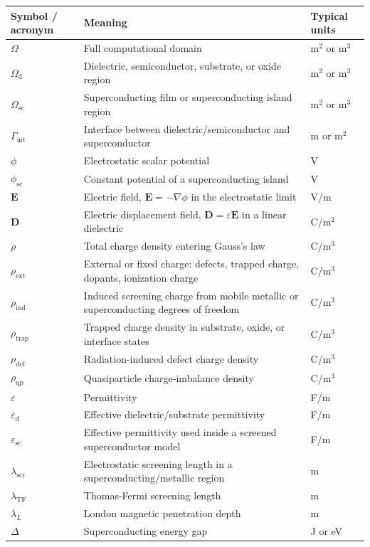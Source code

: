 \documentclass[11pt]{article}
\newcommand{\Evec}{\mathbf{E}}
\newcommand{\Dvec}{\mathbf{D}}
\newcommand{\Om}{\Omega}
\newcommand{\Omd}{\Omega_{\mathrm{d}}}
\newcommand{\Oms}{\Omega_{\mathrm{sc}}}
\newcommand{\Gint}{\Gamma_{\mathrm{int}}}
\newcommand{\epsd}{\varepsilon_{\mathrm{d}}}
\newcommand{\epssc}{\varepsilon_{\mathrm{sc}}}
\newcommand{\rhoext}{\rho_{\mathrm{ext}}}
\newcommand{\rhoind}{\rho_{\mathrm{ind}}}
\newcommand{\rhotrap}{\rho_{\mathrm{trap}}}
\newcommand{\rhodef}{\rho_{\mathrm{def}}}
\newcommand{\rhoqp}{\rho_{\mathrm{qp}}}
\newcommand{\phis}{\phi_{\mathrm{sc}}}
\newcommand{\lams}{\lambda_{\mathrm{scr}}}
\newcommand{\lamTF}{\lambda_{\mathrm{TF}}}
\newcommand{\lamL}{\lambda_{L}}
\newcommand{\DeltaSC}{\Delta}
\begin{document}
\renewcommand{\arraystretch}{1.22}
\begin{longtable}{p{} p{} p{}}
\toprule
\textbf{Symbol / acronym} & \textbf{Meaning} & \textbf{Typical units} \\
\midrule
\endhead
$\Om$ & Full computational domain & m$^2$ or m$^3$ \\
$\Omd$ & Dielectric, semiconductor, substrate, or oxide region & m$^2$ or m$^3$ \\
$\Oms$ & Superconducting film or superconducting island region & m$^2$ or m$^3$ \\
$\Gint$ & Interface between dielectric/semiconductor and superconductor & m or m$^2$ \\
$\phi$ & Electrostatic scalar potential & V \\
$\phis$ & Constant potential of a superconducting island & V \\
$\Evec$ & Electric field, $\Evec=-\nabla\phi$ in the electrostatic limit & V/m \\
$\Dvec$ & Electric displacement field, $\Dvec=\varepsilon\Evec$ in a linear dielectric & C/m$^2$ \\
$\rho$ & Total charge density entering Gauss's law & C/m$^3$ \\
$\rhoext$ & External or fixed charge: defects, trapped charge, dopants, ionization charge & C/m$^3$ \\
$\rhoind$ & Induced screening charge from mobile metallic or superconducting degrees of freedom & C/m$^3$ \\
$\rhotrap$ & Trapped charge density in substrate, oxide, or interface states & C/m$^3$ \\
$\rhodef$ & Radiation-induced defect charge density & C/m$^3$ \\
$\rhoqp$ & Quasiparticle charge-imbalance density & C/m$^3$ \\
$\varepsilon$ & Permittivity & F/m \\
$\epsd$ & Effective dielectric/substrate permittivity & F/m \\
$\epssc$ & Effective permittivity used inside a screened superconductor model & F/m \\
$\lams$ & Electrostatic screening length in a superconducting/metallic region & m \\
$\lamTF$ & Thomas-Fermi screening length & m \\
$\lamL$ & London magnetic penetration depth & m \\
$\DeltaSC$ & Superconducting energy gap & J or eV \\

\end{longtable}
\end{document}
